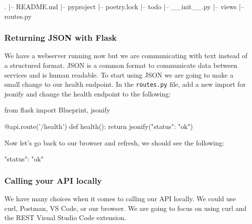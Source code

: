 \documentclass{csse4400}
\begin{document}
\noindent\begin{minipage}{\textwidth}
\begin{code}[language=bash,numbers=none]{}
  .
  |-- README.md
  |-- pyproject
  |-- poetry.lock
  |-- todo
      |-- __init__.py
      |-- views
          |-- routes.py
\end{code}
\end{minipage}

\subsubsection{Returning JSON with Flask}

We have a webserver running now but we are communicating with text instead of a structured format. JSON is a common format to communicate data between services and is human readable. To start using JSON we are going to make a small change to our health endpoint. In the \texttt{routes.py} file, add a new import for jsonify and change the health endpoint to the following:

\begin{code}[language=python]{}
  from flask import Blueprint, jsonify
\end{code}

\begin{code}[language=python,firstnumber=6]{}
  @api.route('/health')
  def health():
      return jsonify({"status": "ok"})
\end{code}

Now let's go back to our browser and refresh, we should see the following:

\begin{code}[language=json,numbers=none]{}
  {
    "status": "ok"
  }
\end{code}


\subsubsection{Calling your API locally}

We have many choices when it comes to calling our API locally.
We could use curl, Postman, VS Code, or our browser.
We are going to focus on using curl and the REST Visual Studio Code extension.

\end{document}
